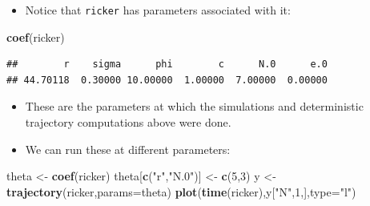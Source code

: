 \documentclass[]{article}
\newenvironment{Shaded}{\begin{snugshade}}{\end{snugshade}}
\newcommand{\KeywordTok}[1]{\textcolor[rgb]{0.13,0.29,0.53}{\textbf{#1}}}
\newcommand{\DataTypeTok}[1]{\textcolor[rgb]{0.13,0.29,0.53}{#1}}
\newcommand{\DecValTok}[1]{\textcolor[rgb]{0.00,0.00,0.81}{#1}}
\newcommand{\StringTok}[1]{\textcolor[rgb]{0.31,0.60,0.02}{#1}}
\newcommand{\NormalTok}[1]{#1}
\providecommand{\tightlist}{%
  \setlength{\itemsep}{0pt}\setlength{\parskip}{0pt}}
\begin{document}
\begin{itemize}
\tightlist
\item
  Notice that \texttt{ricker} has parameters associated with it:
\end{itemize}

\begin{Shaded}
\begin{Highlighting}[]
\KeywordTok{coef}\NormalTok{(ricker)}
\end{Highlighting}
\end{Shaded}

\begin{verbatim}
##        r    sigma      phi        c      N.0      e.0 
## 44.70118  0.30000 10.00000  1.00000  7.00000  0.00000
\end{verbatim}


\begin{itemize}
\item
  These are the parameters at which the simulations and deterministic
  trajectory computations above were done.
\item
  We can run these at different parameters:
\end{itemize}

\begin{Shaded}
\begin{Highlighting}[]
\NormalTok{theta <-}\StringTok{ }\KeywordTok{coef}\NormalTok{(ricker)}
\NormalTok{theta[}\KeywordTok{c}\NormalTok{(}\StringTok{"r"}\NormalTok{,}\StringTok{"N.0"}\NormalTok{)] <-}\StringTok{ }\KeywordTok{c}\NormalTok{(}\DecValTok{5}\NormalTok{,}\DecValTok{3}\NormalTok{)}
\NormalTok{y <-}\StringTok{ }\KeywordTok{trajectory}\NormalTok{(ricker,}\DataTypeTok{params=}\NormalTok{theta)}
\KeywordTok{plot}\NormalTok{(}\KeywordTok{time}\NormalTok{(ricker),y[}\StringTok{"N"}\NormalTok{,}\DecValTok{1}\NormalTok{,],}\DataTypeTok{type=}\StringTok{"l"}\NormalTok{)}
\end{Highlighting}
\end{Shaded}
\end{document}
